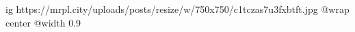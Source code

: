  
 
 
 
 

\ifcmt
  ig https://mrpl.city/uploads/posts/resize/w/750x750/c1tczas7u3fxbtft.jpg
  @wrap center
  @width 0.9
\fi
